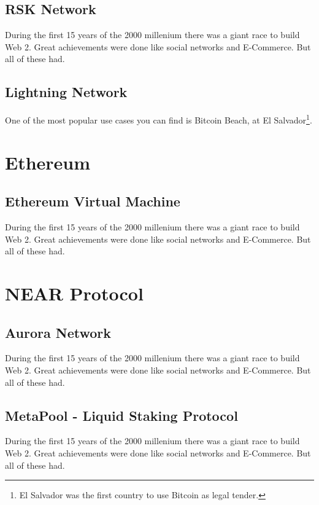 \documentclass[oneside,11pt]{memoir} %
\begin{document}
\chapter{RSK Network}

During the first 15 years of the 2000 millenium there was a giant race to build Web 2. Great achievements were done like social networks and E-Commerce. But all of these had.

\chapter{Lightning Network}
One of the most popular use cases you can find is Bitcoin Beach, at El Salvador\footnote{El Salvador was the first country to use Bitcoin as legal tender.}. 
\part{Ethereum}
\restoregeometry

\chapter{Ethereum Virtual Machine}

During the first 15 years of the 2000 millenium there was a giant race to build Web 2. Great achievements were done like social networks and E-Commerce. But all of these had.

\part{NEAR Protocol}
\restoregeometry

\chapter{Aurora Network}

During the first 15 years of the 2000 millenium there was a giant race to build Web 2. Great achievements were done like social networks and E-Commerce. But all of these had.

\chapter{MetaPool - Liquid Staking Protocol}

During the first 15 years of the 2000 millenium there was a giant race to build Web 2. Great achievements were done like social networks and E-Commerce. But all of these had.
\end{document}
